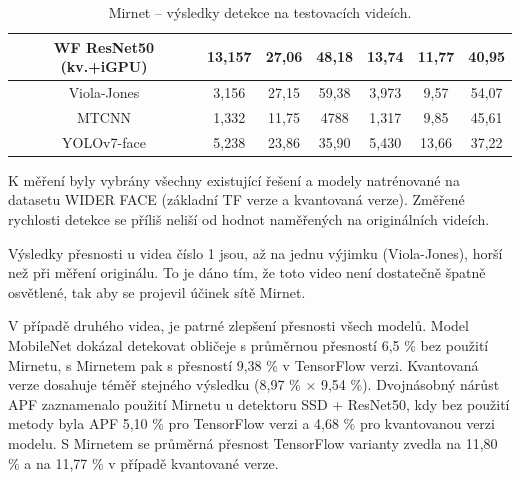 \begin{table}[H]
\begin{tabular}{c|ccc|ccc|}
  \multicolumn{1}{|c|}{\cellcolor[HTML]{E0DBDB}WF ResNet50 (kv.+iGPU)}  & \multicolumn{1}{c|}{13,157}                                 & \multicolumn{1}{c|}{27,06}                                  & 48,18          & \multicolumn{1}{c|}{13,74}                                  & \multicolumn{1}{c|}{11,77}                                  & 40,95          \\ \hline
  \multicolumn{1}{|c|}{\cellcolor[HTML]{E0DBDB}Viola-Jones}                  & \multicolumn{1}{c|}{3,156}                                  & \multicolumn{1}{c|}{27,15}                                  & 59,38          & \multicolumn{1}{c|}{3,973}                                  & \multicolumn{1}{c|}{9,57}                                   & 54,07          \\ \hline
  \multicolumn{1}{|c|}{\cellcolor[HTML]{E0DBDB}MTCNN}                        & \multicolumn{1}{c|}{1,332}                                  & \multicolumn{1}{c|}{11,75}                                  & 4788           & \multicolumn{1}{c|}{1,317}                                  & \multicolumn{1}{c|}{9,85}                                   & 45,61          \\ \hline
  \multicolumn{1}{|c|}{\cellcolor[HTML]{E0DBDB}YOLOv7-face}                  & \multicolumn{1}{c|}{5,238}                                  & \multicolumn{1}{c|}{23,86}                                  & 35,90          & \multicolumn{1}{c|}{5,430}                                  & \multicolumn{1}{c|}{13,66}                                  & 37,22          \\ \hline
  \end{tabular}
  \label{tabulka:mirnet}
  \caption{Mirnet -- výsledky detekce na testovacích videích.}
\end{table}


K měření byly vybrány všechny existující řešení a modely natrénované na datasetu WIDER FACE (základní TF verze a kvantovaná verze). Změřené rychlosti detekce se příliš neliší od hodnot naměřených na originálních videích. 

Výsledky přesnosti u videa číslo 1 jsou, až na jednu výjimku (Viola-Jones), horší než při měření originálu. To je dáno tím, že toto video není dostatečně špatně osvětlené, tak aby se projevil účinek sítě Mirnet. 

V případě druhého videa, je patrné zlepšení přesnosti všech modelů. Model MobileNet dokázal detekovat obličeje s průměrnou přesností 6,5 \% bez použití Mirnetu, s Mirnetem pak s přesností 9,38 \% v TensorFlow verzi. Kvantovaná verze dosahuje téměř stejného výsledku (8,97 \% $\times$ 9,54 \%). Dvojnásobný nárůst APF zaznamenalo použití Mirnetu u detektoru SSD + ResNet50, kdy bez použití metody byla APF 5,10 \% pro TensorFlow verzi a 4,68 \% pro kvantovanou verzi modelu. S Mirnetem se průměrná přesnost TensorFlow varianty zvedla na 11,80 \% a na 11,77 \% v případě kvantované verze.

